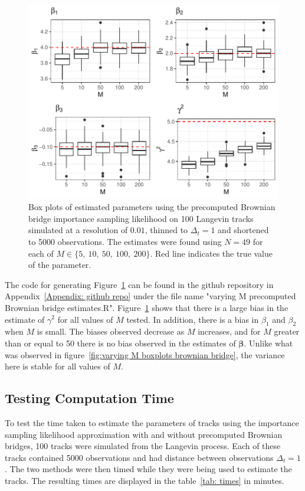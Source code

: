 \begin{figure}[H]
    \centering
    \includegraphics[width=\linewidth]{Images/Results/varying M estimates boxplot precomputed BB.pdf}
    \caption[Box plots of Parameter Estimates using precomputed Brownian bridge importance sampling using different numbers of bridges]{Box plots of estimated parameters using the precomputed Brownian bridge importance sampling likelihood on 100 Langevin tracks simulated at a resolution of $0.01$, thinned to $\Delta_t = 1$ and shortened to 5000 observations. The estimates were found using $N=49$ for each of $M \in \{5 , \ 10, \ 50, \ 100, \ 200\}$. Red line indicates the true value of the parameter.}
    \label{fig:varying M boxplots precomputed brownian bridge}
\end{figure}

The code for generating Figure~\ref{fig:varying M boxplots precomputed brownian bridge} can be found in the github repository in Appendix~\ref{Appendix: github repo} under the file name "varying M precomputed Brownian bridge estimates.R". Figure~\ref{fig:varying M boxplots precomputed brownian bridge} shows that there is a large bias in the estimate of $\gamma^2$ for all values of $M$ tested. In addition, there is a bias in $\beta_1$ and $\beta_2$ when $M$ is small. The biases observed decrease as $M$ increases, and for $M$ greater than or equal to 50 there is no bias observed in the estimates of $\bm \beta$. Unlike what was observed in figure~\ref{fig:varying M boxplots brownian bridge}, the variance here is stable for all values of $M$.


\subsection{Testing Computation Time}
\label{subsec: computation time}
To test the time taken to estimate the parameters of tracks using the importance sampling likelihood approximation with and without precomputed Brownian bridges, 100 tracks were simulated from the Langevin process. Each of these tracks contained 5000 observations and had distance between observations $\Delta_t = 1$. The two methods were then timed while they were being used to estimate the tracks. The resulting times are displayed in the table~\ref{tab: times} in minutes.



